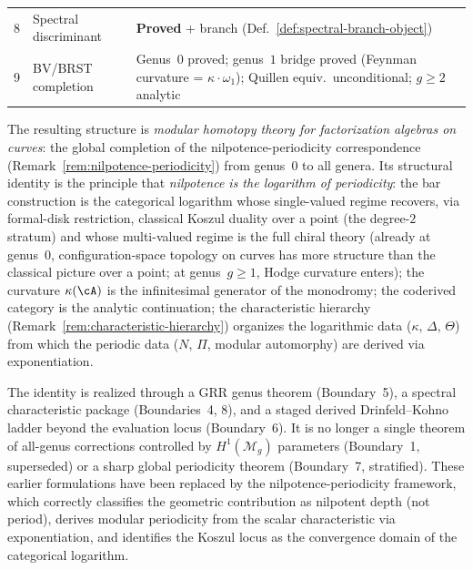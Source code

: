 \begin{remark}
\begin{center}
\begin{tabular}{@{}clp{5.5cm}@{}}
8 & Spectral discriminant & \textbf{Proved} + branch (Def.~\ref{def:spectral-branch-object}) \\
9 & BV/BRST completion & Genus~$0$ proved; genus~$1$ bridge proved (Feynman curvature = $\kappa \cdot \omega_1$); Quillen equiv.\ unconditional; $g \geq 2$ analytic \\
\bottomrule
\end{tabular}
\end{center}
\noindent
The resulting structure is \emph{modular homotopy theory for
factorization algebras on curves}: the global completion of the
nilpotence-periodicity correspondence
(Remark~\ref{rem:nilpotence-periodicity}) from genus~$0$ to all
genera. Its structural identity is the principle that
\emph{nilpotence is the logarithm of periodicity}: the bar
construction is the categorical logarithm whose single-valued
regime recovers, via formal-disk restriction, classical Koszul duality over a point (the degree-$2$ stratum) and whose
multi-valued regime is the full chiral theory (already at genus~$0$, configuration-space topology on curves has more structure than the classical picture over a point; at genus~$g \geq 1$, Hodge curvature enters); the
curvature $\kappa(\cA)$ is the infinitesimal generator of the
monodromy; the coderived category is the analytic continuation; the
characteristic hierarchy
(Remark~\ref{rem:characteristic-hierarchy}) organizes the
logarithmic data ($\kappa$, $\Delta$, $\Theta$) from which the
periodic data ($N$, $\Pi$, modular automorphy) are derived via
exponentiation.

The identity is realized through a GRR genus theorem
(Boundary~5), a spectral characteristic package (Boundaries~4, 8), and a
staged derived Drinfeld--Kohno ladder beyond the evaluation locus
(Boundary~6). It is no longer a single theorem
of all-genus corrections controlled by $H^1(\mathcal{M}_g)$
parameters (Boundary~1, superseded) or a sharp global periodicity
theorem (Boundary~7, stratified). These earlier formulations have been
replaced by the nilpotence-periodicity framework, which correctly
classifies the geometric contribution as nilpotent depth (not
period), derives modular periodicity from the scalar
characteristic via exponentiation, and identifies the Koszul locus
as the convergence domain of the categorical logarithm.
\end{remark}

